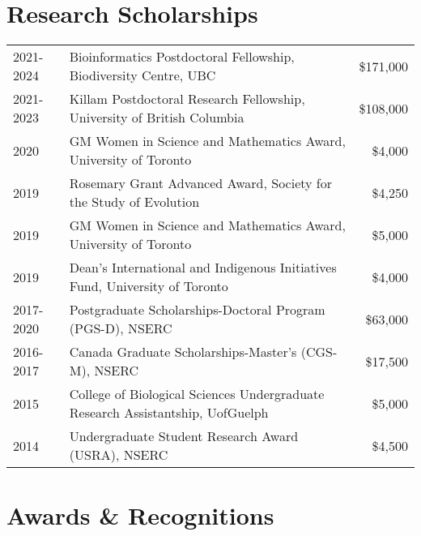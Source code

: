 \documentclass[12pt]{article}
\begin{document}
\section*{Research Scholarships}

\begin{tabular}{llr}

  
  2021-2024 & Bioinformatics Postdoctoral Fellowship, Biodiversity Centre, UBC & \$171,000 \\
  2021-2023 & Killam Postdoctoral Research Fellowship, University of British Columbia & \$108,000 \\
  2020 &  GM Women in Science and Mathematics Award, University of Toronto & \$4,000 \\
  2019 & Rosemary Grant Advanced Award, Society for the Study of Evolution & \$4,250 \\
  2019 & GM Women in Science and Mathematics Award, University of Toronto & \$5,000 \\
  2019 & Dean's International and Indigenous Initiatives Fund, University of Toronto & \$4,000 \\
  2017-2020 &  Postgraduate Scholarships-Doctoral Program (PGS-D), NSERC & \$63,000 \\
  2016-2017 & Canada Graduate Scholarships-Master’s  (CGS-M), NSERC & \$17,500 \\
  2015 & College of Biological Sciences Undergraduate Research Assistantship, UofGuelph & \$5,000 \\
  2014 & Undergraduate Student Research Award (USRA), NSERC & \$4,500 \\
\end{tabular}

\section*{Awards \& Recognitions}
\end{document}

